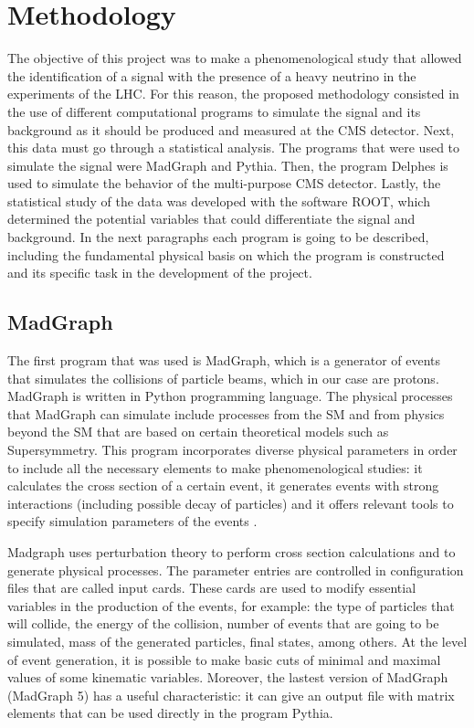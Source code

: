 \chapter{Methodology} 
\label{Methodology_chapter}

The objective of this project was to make a phenomenological study that allowed the identification of a signal with the presence of a heavy neutrino in the experiments of the LHC. For this reason, 
the proposed methodology consisted in the use of different computational programs to simulate the signal and its background as it should be produced and measured at the CMS detector. Next, this 
data must go through a statistical analysis. The programs that were used to simulate the signal were MadGraph and Pythia. Then, the program Delphes is 
used to simulate the behavior of the multi-purpose CMS detector. Lastly, the statistical study of the data was developed with the software ROOT, which determined the 
potential variables that could differentiate the signal and background. In the next paragraphs each program is going to be described, including the fundamental physical basis on which the program 
is constructed and its specific task in the development of the project.

\section{MadGraph}

The first program that was used is MadGraph, which is a generator of events that simulates the collisions of particle beams, which in our case are protons. MadGraph is written in Python programming 
language. The physical processes that MadGraph can simulate include processes from the SM and from physics beyond the SM that are based on certain theoretical models such as Supersymmetry. This 
program incorporates diverse physical parameters in order to include all the necessary elements to make phenomenological studies: it calculates the cross section of a certain event, it generates 
events with strong interactions (including possible decay of particles) and it offers relevant tools to specify simulation parameters of the events \cite{MadGraph 1}. 

Madgraph uses perturbation theory to perform cross section calculations and to generate physical processes. The parameter entries are controlled in configuration files that are called input cards. 
These cards are used to modify essential variables in the production of the events, for example: the type of particles that will collide, the energy of the collision, number of events that are going
to be simulated, mass of the generated particles, final states, among others. At the level of event generation, it is possible to make basic cuts of minimal and maximal values of some kinematic
variables. Moreover, the lastest version of MadGraph (MadGraph 5) has a useful characteristic: it can give an output file with matrix elements that can be used directly in the program Pythia. 

